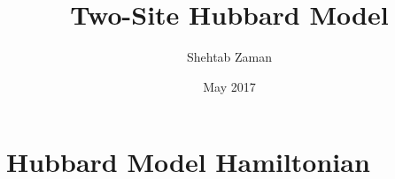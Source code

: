 \documentclass{article}
\title{Two-Site Hubbard Model}
\author{Shehtab Zaman }
\date{May 2017}
\begin{document}
\maketitle
\section{Hubbard Model Hamiltonian}
\end{document}
